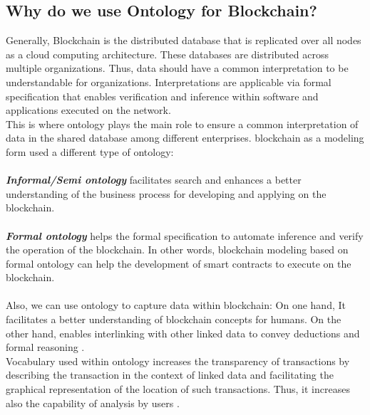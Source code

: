 \subsection{Why do we use Ontology for Blockchain?}
Generally, Blockchain is the distributed database that is replicated over all nodes as a cloud computing architecture. These databases are distributed across multiple organizations. Thus, data should have a common interpretation to be understandable for organizations. Interpretations are applicable via formal specification that enables verification and inference within software and applications executed on the network. \\
This is where ontology plays the main role to ensure a common interpretation of data in the shared database among different enterprises.
blockchain as a modeling form used a different type of ontology: \\
\\
\textbf{\textit{Informal/Semi ontology}} facilitates search and enhances a better understanding of the business process for developing and applying on the blockchain.\\
\\
\textbf{\textit{Formal ontology}} helps the formal specification to automate inference and verify the operation of the blockchain. In other words, blockchain modeling based on formal ontology can help the development of smart contracts to execute on the blockchain.\\
\\
Also, we can use ontology to capture data within blockchain: On one hand, It facilitates a better understanding of blockchain concepts for humans. On the other hand, enables interlinking with other linked data to convey deductions and formal reasoning \cite{Kim}.\\
Vocabulary used within ontology increases the transparency of transactions by describing the transaction in the context of linked data and facilitating the graphical representation of the location of such transactions. Thus, it increases also the capability of analysis by users \cite{Kim}.


